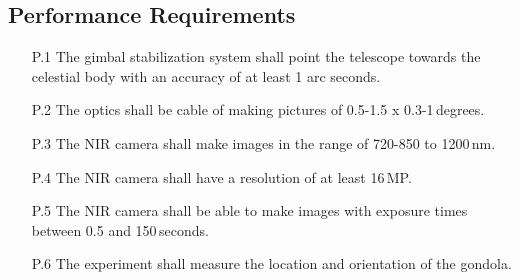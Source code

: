 \subsection{Performance Requirements}

\begin{enumerate}
    \item[P.1] The gimbal stabilization system shall point the telescope towards the celestial body with an accuracy of at least 1 arc seconds.
    \item[P.2] The optics shall be cable of making pictures of 0.5-1.5 x 0.3-1\,degrees.
    \item[P.3] The NIR camera shall make images in the range of 720-850 to 1200\,nm.
    \item[P.4] The NIR camera shall have a resolution of at least 16\,MP.
    \item[P.5] The NIR camera shall be able to make images with exposure times between 0.5 and 150\,seconds.
    \item[P.6] The experiment shall measure the location and orientation of the gondola.
\end{enumerate}